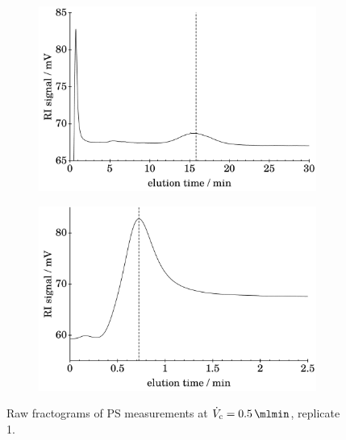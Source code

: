 \begin{figure}[h]
\begin{center}
  \begin{subfigure}{0.49\linewidth} 
    \includegraphics[width=\linewidth]{./images/data/img_PS_VC_05_rep1_te_RI.pdf}
    \label{subfig:raw_PS2_5_r1_te_RI}
  \end{subfigure}
  \begin{subfigure}{0.49\linewidth}
    \includegraphics[width=\linewidth]{./images/data/img_PS_VC_05_rep1_t0_RI.pdf}
\end{subfigure}
  \end{center}
\vspace*{-3ex}    
\caption[Raw fractograms of PS measurements at $\Vc = \SI{0.5}{\mlmin}$, replicate 1.]{
Raw fractograms of PS 
measurements at $\Vc = \SI{0.5}{\mlmin}$, replicate 1.}
\label{fig:raw_PS_0_5_rep1} 
\end{figure}

